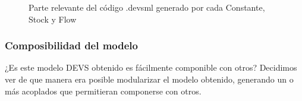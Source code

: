 \begin{figure}[!h]
\centering     %
{}
\caption{Parte relevante del código .devsml generado por cada Constante, Stock y Flow}
\end{figure}

\pagebreak

\subsubsection{Composibilidad del modelo} \label{sssec:cdm}
¿Es este modelo DEVS obtenido es fácilmente componible con otros? Decidimos ver de que manera era posible modularizar el modelo obtenido, generando un o más acoplados que permitieran componerse con otros.

